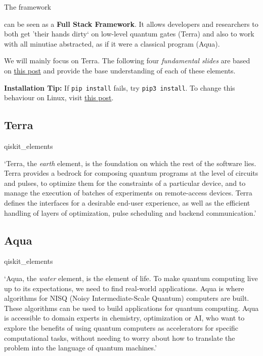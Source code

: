 \documentclass[aspectratio=43]{beamer}
\begin{document}
\begin{frame}{The \qk framework}
    \begin{cardTiny}
        \qk can be seen as a \textbf{Full Stack \q Framework}. It allows developers and researchers to both get 'their hands dirty` on low-level quantum gates (Terra) and also to work with all minutiae abstracted, as if it were a classical program (Aqua). 
    \end{cardTiny}
    \begin{cardTiny}
        We will mainly focus on \qk Terra. The following four \textit{fundamental slides} are based on \href{https://medium.com/qiskit/qiskit-and-its-fundamental-elements-bcd7ead80492}{this post} and provide the base understanding of each of these elements.
    \end{cardTiny}
    \begin{cardTiny}
        \small{\textbf{Installation Tip:}
        If \texttt{pip install} fails, try \texttt{pip3 install}. To change this behaviour on Linux, visit \href{https://askubuntu.com/a/321000}{this post}.
        }
    \end{cardTiny}
\pagenumber
\end{frame}


\subsection{\qk Terra}
\begin{frameImg}{qiskit_elements}
    \begin{card}[\qk Terra]
        `Terra, the \textit{earth} element, is the foundation on which the rest of the software lies. Terra provides a bedrock for composing quantum programs at the level of circuits and pulses, to optimize them for the constraints of a particular device, and to manage the execution of batches of experiments on remote-access devices. Terra defines the interfaces for a desirable end-user experience, as well as the efficient handling of layers of optimization, pulse scheduling and backend communication.'
    \end{card}
\pagenumber
\end{frameImg}

\subsection{\qk Aqua}
\begin{frameImg}{qiskit_elements}
    \begin{card}[\qk Aqua]
    `Aqua, the \textit{water} element, is the element of life. To make quantum computing live up to its expectations, we need to find real-world applications. Aqua is where algorithms for NISQ (Noisy Intermediate-Scale Quantum) computers are built. These algorithms can be used to build applications for quantum computing. Aqua is accessible to domain experts in chemistry, optimization or AI, who want to explore the benefits of using quantum computers as accelerators for specific computational tasks, without needing to worry about how to translate the problem into the language of quantum machines.'
    \end{card}
\pagenumber
\end{frameImg}
\end{document}
